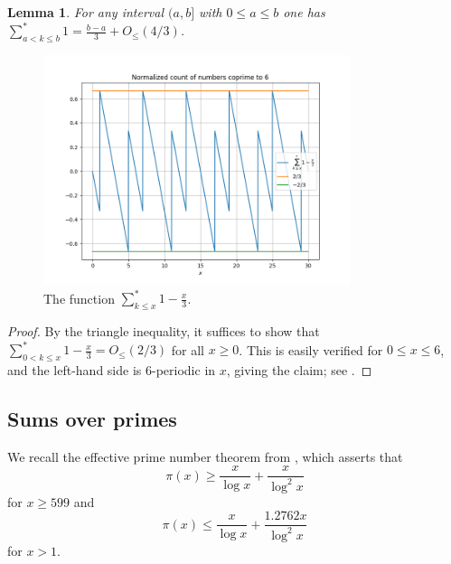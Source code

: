 \documentclass[12pt,a4paper,reqno]{amsart}
\numberwithin{equation}{section}
\theoremstyle{plain}
\newtheorem{lemma}[theorem]{Lemma}
\theoremstyle{definition}
\begin{document}
\begin{lemma}\label{lit}  For any interval $(a,b]$ with $0 \leq a \leq b$ one has $\sum_{a < k \leq b}^* 1 = \frac{b-a}{3} + O_{\leq}(4/3)$.
\end{lemma}

\begin{figure}
  \centering
  \includegraphics[width=0.8\textwidth]{sawtooth.png}
  \vspace{-8pt}
  \caption{The function $\sum_{k \leq x}^* 1 - \frac{x}{3}$.}\label{fig-saw}
\end{figure}

\begin{proof}  By the triangle inequality, it suffices to show that $\sum_{0 < k \leq x}^* 1 - \frac{x}{3} = O_{\leq}(2/3)$ for all $x \geq 0$.  This is easily verified for $0 \leq x \leq 6$, and the left-hand side is $6$-periodic in $x$, giving the claim; see .
\end{proof}

\subsection{Sums over primes}

We recall the effective prime number theorem from \cite[Corollary 5.2]{dusart}, which asserts that
\begin{equation}\label{pi-lower}
  \pi(x) \geq \frac{x}{\log x} + \frac{x}{\log^2 x}
\end{equation}
for $x \geq 599$ and
\begin{equation}\label{pi-upper}
  \pi(x) \leq \frac{x}{\log x} + \frac{1.2762 x}{\log^2 x}
\end{equation}
for $x >1$.  
\end{document}
